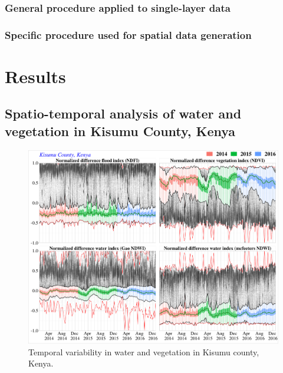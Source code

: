 \documentclass[]{elsarticle} %
\begin{document}
\hypertarget{section_2_5_2}{%
\subsubsection{General procedure applied to single-layer data}\label{section_2_5_2}}

\hypertarget{section_2_5_3}{%
\subsubsection{Specific procedure used for spatial data generation}\label{section_2_5_3}}

\hypertarget{II}{%
\section{Results}\label{II}}

\hypertarget{section_3_1}{%
\subsection{Spatio-temporal analysis of water and vegetation in Kisumu County, Kenya}\label{section_3_1}}

\begin{figure}[!h]

{\centering \includegraphics[width=1\linewidth,]{figures/seasonal_ranges_plot} 

}

\caption{Temporal variability in water and vegetation in Kisumu county, Kenya.}\label{fig:fig4}
\end{figure}
\end{document}
